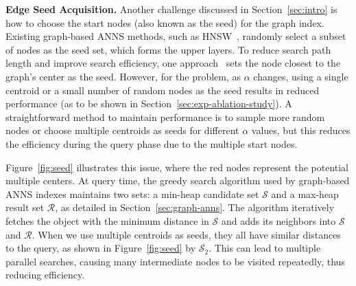 


\noindent\textbf{Edge Seed Acquisition.} %
Another challenge discussed in Section~\ref{sec:intro} is how to choose the start nodes (also known as the seed) for the graph index. 
Existing graph-based ANNS methods, such as HNSW~\cite{malkovEfficientRobustApproximate2020}, randomly select a subset of nodes as the seed set, which forms the upper layers. To reduce search path length and improve search efficiency, one approach~\cite{fu2019fast} sets the node closest to the graph's center as the seed. %
However, for the \hvq problem, as $\alpha$ changes, using a single centroid or a small number of random nodes as the seed results in reduced performance (as to be shown in Section~\ref{sec:exp-ablation-study}). A straightforward method to maintain performance is to sample more random nodes or choose multiple centroids as seeds for different $\alpha$ values, but this reduces the efficiency during the query phase due to the multiple start nodes.

Figure~\ref{fig:seed} illustrates this issue, where the red nodes represent the potential multiple centers. At query time, the greedy search algorithm used by graph-based ANNS indexes maintains two sets: a min-heap candidate set $\mathcal{S}$ and a max-heap result set $\mathcal{R}$, as detailed in Section~\ref{sec:graph-anns}. The algorithm iteratively fetches the object with the minimum distance in $\mathcal{S}$ and adds its neighbors into $\mathcal{S}$ and $\mathcal{R}$. When we use multiple centroids as seeds, they all have similar distances to the query, as shown in Figure~\ref{fig:seed} by $\mathcal{S}_2$. This can lead to multiple parallel searches, causing many intermediate nodes to be visited repeatedly, thus reducing efficiency.


